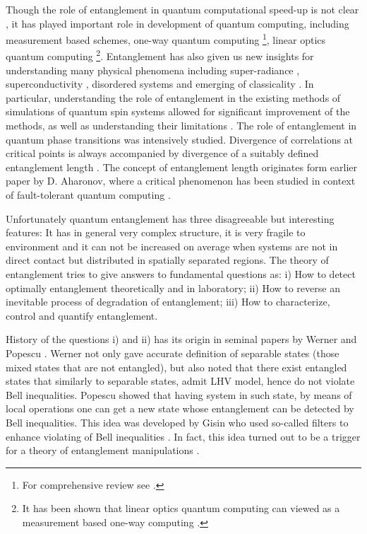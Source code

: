 \documentclass[twocolumn,aps,rmp]{revtex4}
\begin{document}
Though the role of entanglement in quantum computational speed-up is
not clear \cite {KendonM2006}, it has played important role in development of quantum
computing, including measurement based schemes, one-way quantum
computing \cite{RaussendorfBriegelOneWay}\footnote{For comprehensive
  review see \cite {BrowneB}.}, linear optics quantum computing
\cite{KnillLM2001-lin-opt}\footnote{It has been shown that
  linear optics quantum computing can viewed as a measurement based
  one-way computing \cite{popescu-2006}.}. Entanglement has also given
us new insights for understanding many physical phenomena including
super-radiance \cite {Lambert}, superconductivity \cite{Vedral},
disordered systems \cite {DurHHLB} and emerging of classicality
\cite{Zurek03}. In particular, understanding the role of entanglement
in the existing methods of simulations of quantum spin systems allowed
for significant improvement of the methods, as well as understanding
their limitations \cite{Vidal,Vidal1,Verstraete,AndreasPD}. The role
of entanglement in quantum phase transitions
\cite{LarssonJ,OsborneN,Osterloh,Latorre,Rico,VerstraetePC2003-locent}
was intensively studied. Divergence of correlations at critical points
is always accompanied by divergence of a suitably defined entanglement
length \cite{VerstraetePC2003-locent}. The concept of entanglement
length originates form earlier paper by D. Aharonov, where a critical
phenomenon has been studied in context of fault-tolerant quantum
computing \cite{dorit-phase}.


Unfortunately quantum entanglement has three disagreeable but
interesting features: It has in general very complex structure, it is
very fragile to environment and it can not be increased on average
when systems are not in direct contact but distributed in spatially
separated regions. The theory of entanglement tries to give answers to
fundamental questions as: i) How to detect optimally entanglement
theoretically and in laboratory; ii) How to reverse an inevitable
process of degradation of entanglement; iii) How to characterize,
control and quantify entanglement.

History of the questions i) and ii) has its origin in seminal papers
by Werner and Popescu \cite {Werner1989,Popescu2}. Werner not only gave
accurate definition of separable states (those mixed states that are
not entangled), but also noted that there exist entangled states that
similarly to separable states, admit LHV model, hence do not violate
Bell inequalities. Popescu showed \cite{Popescu2} that having system
in such state, by means of local operations one can get a new state
whose entanglement can be detected by Bell inequalities. This idea was
developed by Gisin who used so-called filters to enhance violating of
Bell inequalities \cite {Gisin96}. In fact, this idea turned out to be
a trigger for a theory of entanglement manipulations
\cite{BBPSSW1996}.
\end{document}
